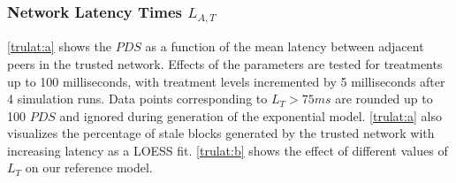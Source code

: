 \documentclass[a4paper,12pt,twoside]{report}
\begin{document}
\subsubsection{Network Latency Times $L_{A,T}$}
\autoref{trulat:a} shows the $PDS$ as a function of the mean latency between adjacent peers in the trusted network. Effects of the parameters are tested for treatments up to 100 milliseconds, with treatment levels incremented by 5 milliseconds after 4 simulation runs. Data points corresponding to $L_T > 75ms$ are rounded up to 100 $PDS$ and ignored during generation of the exponential model. \autoref{trulat:a} also visualizes the percentage of stale blocks generated by the trusted network with increasing latency as a LOESS fit. \autoref{trulat:b} shows the effect of different values of $L_T$ on our reference model.
\end{document}

